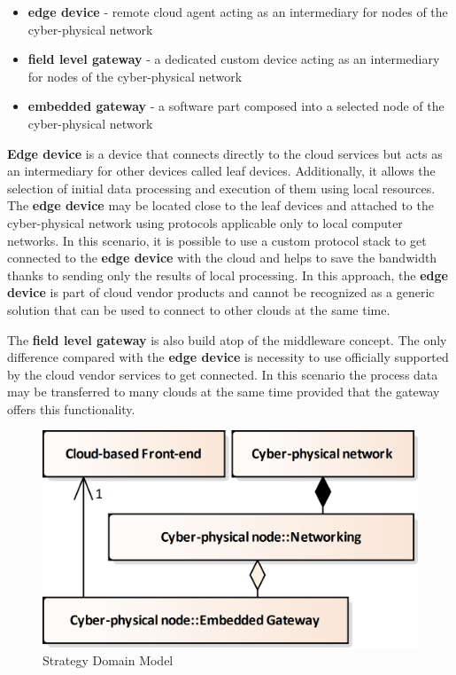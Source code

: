 \documentclass{jacsart}
\providecommand{\tightlist} { \setlength{\itemsep}{0pt}\setlength{\parskip}{0pt}}
\begin{document}
\begin{itemize}
\tightlist
\item
  \textbf{edge device} - remote cloud agent acting as an intermediary
  for nodes of the cyber-physical network
\item
  \textbf{field level gateway} - a dedicated custom device acting as an
  intermediary for nodes of the cyber-physical network
\item
  \textbf{embedded gateway} - a software part composed into a selected
  node of the cyber-physical network
\end{itemize}

\textbf{Edge device} is a device that connects directly to the cloud
services but acts as an intermediary for other devices called leaf
devices. Additionally, it allows the selection of initial data
processing and execution of them using local resources. The \textbf{edge
device} may be located close to the leaf devices and attached to the
cyber-physical network using protocols applicable only to local computer
networks. In this scenario, it is possible to use a custom protocol
stack to get connected to the \textbf{edge device} with the cloud and
helps to save the bandwidth thanks to sending only the results of local
processing. In this approach, the \textbf{edge device} is part of cloud
vendor products and cannot be recognized as a generic solution that can
be used to connect to other clouds at the same time.

The \textbf{field level gateway} is also build atop of the middleware
concept. The only difference compared with the \textbf{edge device} is
necessity to use officially supported by the cloud vendor services to
get connected. In this scenario the process data may be transferred to
many clouds at the same time provided that the gateway offers this
functionality.

\begin{figure}
\centering
\includegraphics{../.Media/StrategyDomainModel.png}
\caption{Strategy Domain Model}\label{StrategyDomainModel}
\end{figure}
\end{document}
